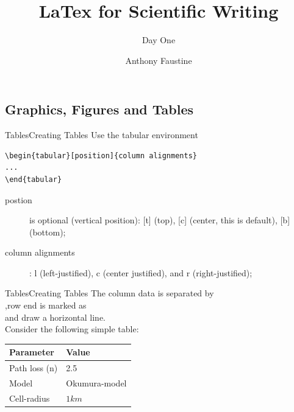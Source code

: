 \documentclass{beamer}
\title{LaTex for Scientific Writing} %
\subtitle{Day One} %
\author{Anthony Faustine}
\begin{document}
  \frame{\maketitle}


  \begin{darkframes}
    


\section{Graphics, Figures and Tables}

\begin{frame}[fragile]{Tables}{Creating Tables}
Use the tabular environment
\begin{verbatim}
\begin{tabular}[position]{column alignments}
...
\end{tabular}
\end{verbatim}

\begin{description}
	\item[postion] is optional (vertical position): [t] (top), [c]
	(center, this is default), [b] (bottom);
	\item [column alignments]: l (left-justified), c (center justified),
	and r (right-justified);
\end{description}
\end{frame}

\begin{frame}[fragile]{Tables}{Creating Tables}
The column data is separated by \texttt{\\},row end is marked as \texttt{\\} and \texttt{\hline} draw a horizontal line.\\
Consider the following simple table:\\
\centering
\begin{tabular}[t]{|l|l|}
	\hline 
	\textbf{Parameter} & \textbf{Value}\\
	\hline 
	Path loss (n) & 2.5\\
	Model & Okumura-model\\
	Cell-radius & $1km$\\
	\hline
\end{tabular}


\end{frame}
\end{darkframes}
\end{document}
